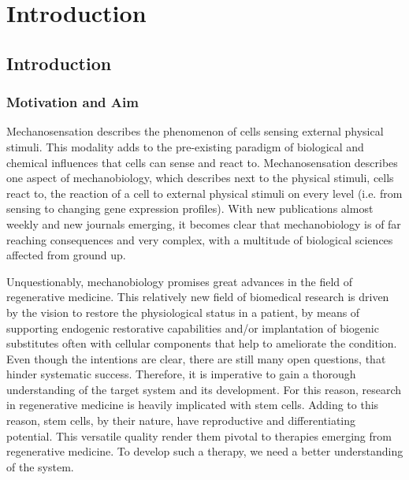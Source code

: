 \newcommand{\package}{\emph}


\chapter{Introduction}

\section{Introduction}
\subsection{Motivation and Aim}
\label{sec:motivation}
Mechanosensation describes the phenomenon of cells sensing external physical stimuli.  This modality adds to the pre-existing paradigm of biological and chemical influences that cells can sense and react to. Mechanosensation describes one aspect of mechanobiology, which describes next to the physical stimuli, cells react to, the reaction of a cell to external physical stimuli on every level (i.e. from sensing to changing gene expression profiles).  With new publications almost weekly and new journals emerging, it becomes clear that mechanobiology is of far reaching consequences and very complex, with a multitude of biological sciences affected from ground up. 
\par 

Unquestionably, mechanobiology promises great advances in the field of regenerative medicine. This relatively new field of biomedical research is driven by the vision to restore the physiological status in a patient, by means of supporting endogenic restorative capabilities and/or implantation of biogenic substitutes often with cellular components that help to ameliorate the condition.  Even though the intentions are clear, there are still many open questions, that hinder systematic success. Therefore, it is imperative to gain a thorough understanding of the target system and its development. For this reason, research in regenerative medicine is heavily implicated with stem cells. Adding to this reason, stem cells, by their nature, have reproductive and differentiating potential. This versatile quality render them pivotal to therapies emerging from regenerative medicine. To develop such a therapy, we need a better understanding of the system. \par

